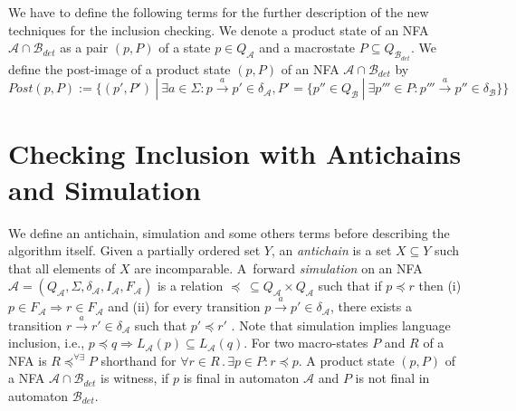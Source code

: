 We have to define the following terms for the further description of the new techniques for the inclusion checking.
We denote a product state of an NFA $\mathcal{A} \cap \mathcal{B}_{det}$ as a pair $(p,P)$ of a state $p\in Q_\mathcal{A}$ and a 
macrostate $P \subseteq Q_{\mathcal{B}_{det}}$.
We define the post-image of a product state $(p,P)$ of an NFA $\mathcal{A}\cap \mathcal{B}_{det}$ by
$Post(p,P):=\{(p',P')\ |\ \exists a \in \Sigma: p\xrightarrow{a} p' \in \delta_\mathcal{A}, P'=
\{p''\in Q_\mathcal{B}\ |\ \exists p''' \in P:p'''\xrightarrow{a} p''\in \delta_\mathcal{B}\}\}$

\section{Checking Inclusion with Antichains and Simulation}
\label{sectionAntichain}
We define an antichain, simulation and some others terms before describing the algorithm itself.
Given a partially ordered set $Y$, an \emph {antichain} is a set $X \subseteq Y$ such that all elements of $X$ are incomparable.
A~forward \emph{simulation} on an NFA $\mathcal{A}=(Q_\mathcal{A},\Sigma,\delta_\mathcal{A},I_\mathcal{A},F_\mathcal{A})$ 
is a relation $\preceq\  \subseteq Q_\mathcal{A} \times Q_\mathcal{A}$ 
such that if $p \preceq r$ then (i) $p \in F_\mathcal{A} 
\Rightarrow r \in F_\mathcal{A}$ and (ii) for every transition $p\xrightarrow{a}p' \in \delta_\mathcal{A}$, there exists a transition 
$r\xrightarrow{a}r' \in \delta_\mathcal{A}$ such that $p' \preceq r'$  \cite{focs95}. 
Note that simulation implies language inclusion, i.e., $p\preceq q \Rightarrow L_\mathcal{A}(p)
\subseteq L_\mathcal{A}(q)$. 
%
For two macro-states $P$ and $R$ of a NFA is $R\preceq^{\forall\exists}P$ shorthand for $\forall r\in R\,.\,\exists p \in P: r \preceq p$.
A product state $(p,P)$ of a NFA $\mathcal{A} \cap \mathcal{B}_{det}$ is witness, if $p$ is final in automaton $\mathcal{A}$ 
and $P$ is not final in automaton $\mathcal{B}_{det}$. %

